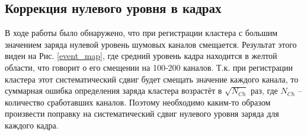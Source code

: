 \subsection{Коррекция нулевого уровня в кадрах}
\par В ходе работы было обнаружено, что при регистрации кластера с большим значением заряда нулевой уровень шумовых каналов смещается. Результат этого виден на Рис. \ref{event_map}, где средний уровень кадра находится в желтой области, что говорит о его смещении на 100-200 каналов. Т.к. при регистрации кластера этот систематический сдвиг будет смещать значение каждого канала, то суммарная ошибка определения заряда кластера возрастёт в $\sqrt{N_{Ch}}$ раз, где $N_{Ch}$ -- количество сработавших каналов. Поэтому необходимо каким-то образом произвести поправку на систематический сдвиг нулевого уровня заряда для каждого кадра.
